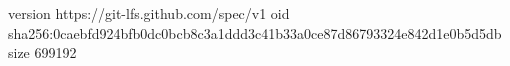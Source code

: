 version https://git-lfs.github.com/spec/v1
oid sha256:0caebfd924bfb0dc0bcb8c3a1ddd3c41b33a0ce87d86793324e842d1e0b5d5db
size 699192
